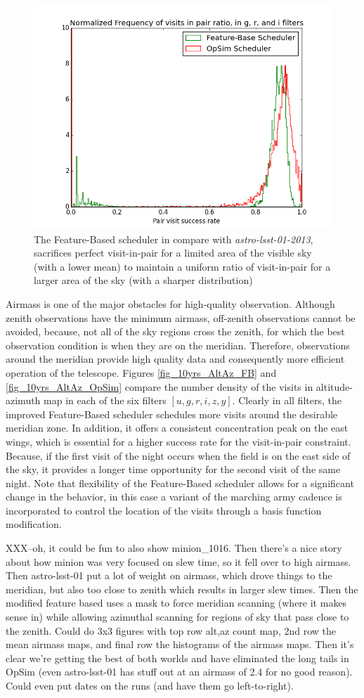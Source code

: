 \documentclass[12pt,aas_macros]{article}
\theoremstyle{definition}
\begin{document}
\begin{figure}[h!]
\centering
\includegraphics[width=.5\linewidth]{PairHist.png}
\caption{The Feature-Based scheduler in compare with \textit{astro-lsst-01-2013}, sacrifices perfect visit-in-pair for a limited area of the visible sky (with a lower mean) to maintain a uniform ratio of visit-in-pair for a larger area of the sky (with a sharper distribution)}
\label{fig_10yrs_pair_hist}
\end{figure}

Airmass is one of the major obstacles for high-quality observation. Although zenith observations have the minimum airmass, off-zenith observations cannot be avoided, because, not all of the sky regions cross the zenith, for which the best observation condition is when they are on the meridian. Therefore, observations around the meridian provide high quality data and consequently more efficient operation of the telescope. Figures \ref{fig_10yrs_AltAz_FB} and \ref{fig_10yrs_AltAz_OpSim} compare the number density of the visits in altitude-azimuth map in each of the six filters $[u,g,r,i,z,y]$. Clearly in all filters, the improved Feature-Based scheduler schedules more visits around the desirable meridian zone. In addition, it offers a consistent concentration peak on the east wings, which is essential for a higher success rate for the visit-in-pair constraint. Because, if the first visit of the night occurs when the field is on the east side of the sky, it provides a longer time opportunity for the second visit of the same night. Note that flexibility of the Feature-Based scheduler allows for a significant change in the behavior, in this case a variant of the marching army cadence is incorporated to control the location of the visits through a basis function modification.

XXX--oh, it could be fun to also show minion\_1016. Then there's a nice story about how minion was very focused on slew time, so it fell over to high airmass. Then astro-lsst-01 put a lot of weight on airmass, which drove things to the meridian, but also too close to zenith which results in larger slew times. Then the modified feature based uses a mask to force meridian scanning (where it makes sense in) while allowing azimuthal scanning for regions of sky that pass close to the zenith. Could do 3x3 figures with top row alt,az count map, 2nd row the mean airmass maps, and final row the histograms of the airmass maps. Then it's clear we're getting the best of both worlds and have eliminated the long tails in OpSim (even astro-lsst-01 has stuff out at an airmass of 2.4 for no good reason). Could even put dates on the runs (and have them go left-to-right).
\end{document}
